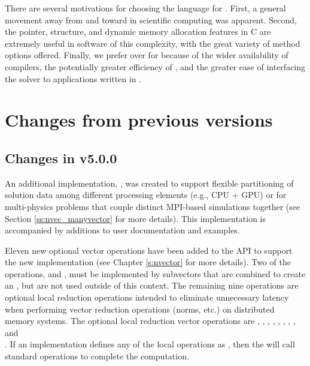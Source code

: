  There are
several motivations for choosing the {\CC} language for {\kinsol}.
First, a general movement away from {\F} and toward {\CC} in
scientific computing was apparent. Second, the pointer, structure,
and dynamic memory allocation features in C are extremely useful
in software of this complexity, with the great variety of method
options offered. Finally, we prefer {\CC} over {\CPP} for {\kinsol}
because of the wider availability of {\CC} compilers, the
potentially greater efficiency of {\CC}, and the greater ease of
interfacing the solver to applications written in {\F}.


\section{Changes from previous versions}

\subsection*{Changes in v5.0.0}

An additional {\nvector} implementation, {\nvecmanyvector}, was
created to support flexible partitioning of solution data among
different processing elements (e.g., CPU + GPU) or for multi-physics
problems that couple distinct MPI-based simulations together (see
Section \ref{ss:nvec_manyvector} for more details).  This
implementation is accompanied by additions to user documentation and
{\sundials} examples.

Eleven new optional vector operations have been added to the {\nvector} API to
support the new {\nvecmanyvector} implementation (see Chapter \ref{s:nvector}
for more details). Two of the operations,  and
, must be implemented by subvectors that are combined to
create an {\nvecmanyvector}, but are not used outside of this context. The
remaining nine operations are optional local reduction operations intended to
eliminate unnecessary latency when performing vector reduction operations
(norms, etc.) on distributed memory systems. The optional local reduction vector
operations are
,
,
,
,
,
,
,
, and\\
.
If an {\nvector} implementation defines any of the local operations as
, then the {\nvecmanyvector} will call standard {\nvector} operations
to complete the computation.


